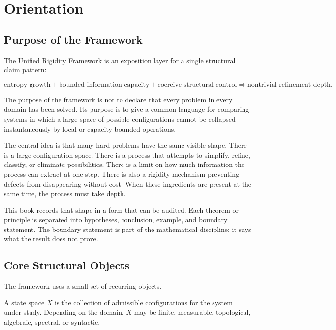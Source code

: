 \chapter{Orientation}

\section{Purpose of the Framework}

The Unified Rigidity Framework is an exposition layer for a single structural
claim pattern:

\[
\text{entropy growth}
+
\text{bounded information capacity}
+
\text{coercive structural control}
\Longrightarrow
\text{nontrivial refinement depth}.
\]

The purpose of the framework is not to declare that every problem in every
domain has been solved. Its purpose is to give a common language for comparing
systems in which a large space of possible configurations cannot be collapsed
instantaneously by local or capacity-bounded operations.

The central idea is that many hard problems have the same visible shape.
There is a large configuration space. There is a process that attempts to
simplify, refine, classify, or eliminate possibilities. There is a limit on
how much information the process can extract at one step. There is also a
rigidity mechanism preventing defects from disappearing without cost. When
these ingredients are present at the same time, the process must take depth.

This book records that shape in a form that can be audited. Each theorem or
principle is separated into hypotheses, conclusion, example, and boundary
statement. The boundary statement is part of the mathematical discipline: it
says what the result does not prove.

\section{Core Structural Objects}

The framework uses a small set of recurring objects.

\begin{definition}
A state space \(X\) is the collection of admissible configurations for the
system under study. Depending on the domain, \(X\) may be finite, measurable,
topological, algebraic, spectral, or syntactic.
\end{definition}


